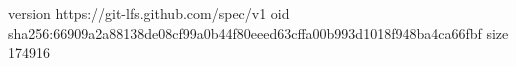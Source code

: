 version https://git-lfs.github.com/spec/v1
oid sha256:66909a2a88138de08cf99a0b44f80eeed63cffa00b993d1018f948ba4ca66fbf
size 174916
